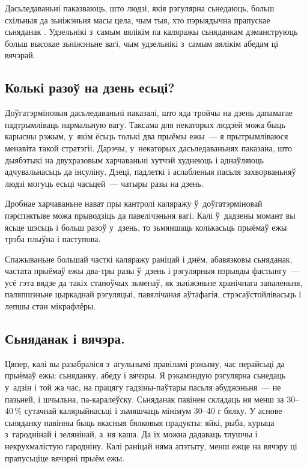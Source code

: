 Дасьледаваньні паказваюць, што людзі, якія рэгулярна сьнедаюць, больш схільныя да зьніжэньня масы цела, чым тыя, хто пэрыядычна прапускае сьняданак . Удзельнікі з~самым вялікім па каляражы сьняданкам дэманструюць больш высокае зьніжэньне вагі, чым удзельнікі з~самым вялікім абедам ці вячэрай.

\subsection*{Колькі разоў на дзень есьці?}
Доўгатэрміновыя дасьледаваньні паказалі, што яда тройчы на дзень дапамагае падтрымліваць нармальную вагу. Таксама для некаторых людзей можа быць карысны рэжым, у~якім ёсьць толькі два прыёмы ежы~--- я прытрымліваюся менавіта такой стратэгіі. Дарэчы, у~некаторых дасьледаваньнях паказана, што дыябэтыкі на двухразовым харчаваньні хутчэй худнеюць і аднаўляюць адчувальнасьць да інсуліну. Дзеці, падлеткі і аслабленыя пасьля захворваньняў людзі могуць есьці часьцей~--- чатыры разы на дзень.

Дробнае харчаваньне нават пры кантролі каляражу ў~доўгатэрміновай пэрспэктыве можа прыводзіць да павелічэньня вагі. Калі ў~дадзены момант вы ясьце шэсьць і больш разоў у~дзень, то зьмяншаць колькасьць прыёмаў ежы трэба плыўна і паступова.

Спажываньне большай часткі каляражу раніцай і днём, абавязковы сьняданак, частата прыёмаў ежы два-тры разы ў~дзень і рэгулярныя пэрыяды фастынгу~--- усё гэта вядзе да такіх станоўчых зьменаў, як зьніжэньне хранічнага запаленьня, паляпшэньне цыркаднай рэгуляцыі, павялічаная аўтафагія, стрэсаўстойлівасьць і лепшы стан мікрафлёры.

\subsection*{Сьняданак і вячэра.}
Цяпер, калі вы разабраліся з~агульнымі правіламі рэжыму, час перайсьці да прыёмаў ежы: сьняданку, абеду і вячэры. Я рэкамэндую рэгулярна сьнедаць у~адзін і той жа час, на працягу гадзіны-паўтары пасьля абуджэньня~--- не пазьней, і шчыльна, па-каралеўску. Сьняданак павінен складаць ня менш за 30--40\,\% сутачнай калярыйнасьці і зьмяшчаць мінімум 30--40 г бялку. У аснове сьняданку павінны быць якасныя бялковыя прадукты: яйкі, рыба, курыца з~гароднінай і зелянінай, а~ня каша. Да іх можна дадаваць тлушчы і некрухмалістую гародніну. Калі раніцай няма апэтыту, менш ежце на вячэру ці прапусьціце вячэрні прыём ежы.

